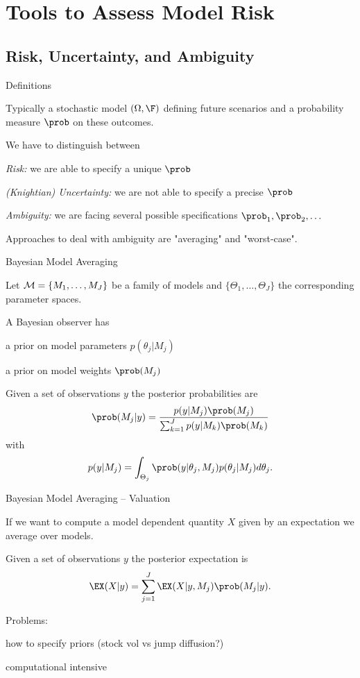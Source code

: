 \section{Tools to Assess Model Risk}
\subsection{Risk, Uncertainty, and Ambiguity}

{Definitions}
\item<1-> Typically a stochastic model $(\Omega, \F)$ defining future scenarios and a
probability measure $\prob$ on these outcomes.
\item<2->  We have to distinguish between
\item {\it Risk:}  we are able to specify a unique $\prob$
\item {\it (Knightian) Uncertainty:} we are not able to specify a precise $\prob$
\item {\it Ambiguity:}  we are facing several possible specifications $\prob_1, \prob_2, \ldots$%
\item<3-> Approaches to deal with ambiguity are "averaging" and "worst-case".

{Bayesian Model Averaging}
\item<1-> Let ${\cal M}= \{M_1, \dots, M_J\}$ be a family of models and  $\{\Theta_1, \dots, \Theta_J\}$ the corresponding parameter spaces.
\item<2->  A Bayesian observer has
\item a prior on model parameters $p(\theta_j|M_j)$
\item a prior on model weights $\prob(M_j)$
\item<3-> Given a set of observations $y$ the posterior probabilities are
$$
\prob(M_j|y) = \frac{p(y|M_j)\prob(M_j)}{\sum_{k=1}^{J}p(y|M_k)\prob(M_k)}
$$
with
$$
p(y|M_j)=\int_{\Theta_j} \prob(y|\theta_j, M_j)p(\theta_j|M_j) d\theta_j.
$$

{Bayesian Model Averaging -- Valuation}
\item<1-> If we want to compute a model dependent quantity $X$ given by an expectation we average over models.
\item<2-> Given a set of observations $y$ the posterior expectation is
$$
\EX(X|y) = \sum_{j=1}^{J} \EX(X |y, M_j) \prob(M_j |y).
$$
\item<3-> Problems:
\item how to specify priors (stock vol vs jump diffusion?)
\item computational intensive


